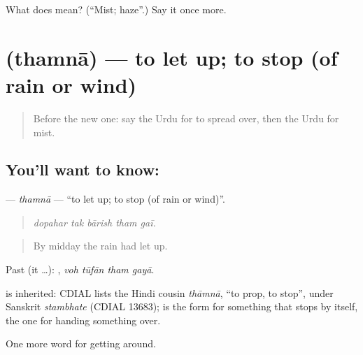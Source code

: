 \begin{tcolorbox}[breakable,colback=teal!4,colframe=teal!35!black,title={Before you move on}]
What does  mean? (\textquotedblleft{}Mist; haze\textquotedblright{}.) Say it once more.
\end{tcolorbox}
\section[\texorpdfstring{\ur{تھمنا} (thamnā)}{تھمنا (thamnā)}]{ (thamnā) — to let up; to stop (of rain or wind)}

\label{lesson:UR-C431-thamna-let-up}



\begin{quote}
Before the new one: say the Urdu for to spread over, then the Urdu for mist.
\end{quote}

\subsection*{You'll want to know: }
\textbf{} — \emph{thamnā} — \textquotedblleft{}to let up; to stop (of rain or wind)\textquotedblright{}.

\begin{quote}
    
\end{quote}

\begin{quote}
\emph{dopahar tak bārish tham gaī.}
\end{quote}

\begin{quote}
By midday the rain had let up.
\end{quote}

Past (it …):    , \emph{voh tūfān tham gayā}.

\begin{cousinweb}
is inherited: CDIAL lists the Hindi cousin \emph{thāmnā}, \textquotedblleft{}to prop, to stop\textquotedblright{}, under Sanskrit \emph{stambhate} (CDIAL 13683); \textbf{} is the form for something that stops by itself, \textbf{} the one for handing something over.
\end{cousinweb}

\begin{grammarlens}[title={What you've built}]
One more word for getting around.
\end{grammarlens}

